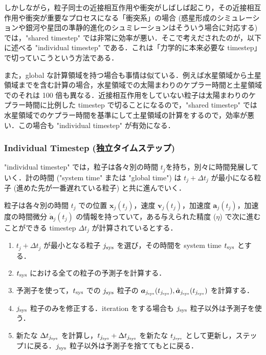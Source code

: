 \documentclass[11pt,a4paper,oneside,onecolumn]{jarticle}
\begin{document}
しかしながら，粒子同士の近接相互作用や衝突がしばしば起こり，その近接相互作用や衝突が重要なプロセスになる「衝突系」の場合 (惑星形成のシミュレーションや銀河や星団の準静的進化のシュミレーションはそういう場合に対応する) では，"shared timestep" では非常に効率が悪い．そこで考えだされたのが，以下に述べる "individual timestep" である．これは「力学的に本来必要な timestep」で切っていこうという方法である．

また，global な計算領域を持つ場合も事情は似ている．例えば水星領域から土星領域までを含む計算の場合，水星領域での太陽まわりのケプラー時間と土星領域でのそれは 100 倍も異なる．近接相互作用をしていない粒子は太陽まわりのケプラー時間に比例した timestep で切ることになるので，"shared timestep" では水星領域でのケプラー時間を基準にして土星領域の計算をするので，効率が悪い．この場合も "individual timestep" が有効になる．

\subsubsection{Individual Timestep (独立タイムステップ) }
"individual timestep" では，粒子は各々別の時間 $t_j$を持ち，別々に時間発展していく．計の時間 ("system time" または "global time") は $t_j + \Delta t_j$ が最小になる粒子 (進めた先が一番遅れている粒子) と共に進んでいく．

粒子は各々別の時間 $t_j$ での位置 ${\bm x}_j (t_j)$，速度 ${\bm v}_j (t_j)$，加速度 ${\bm a}_j (t_j)$，加速度の時間微分 $\dot{{\bm a}}_j (t_j)$ の情報を持っていて，ある与えられた精度 ($\eta$) で次に進むことができる timestep $\Delta t_j$ が計算されているとする．

\begin{enumerate}
\item $t_j + \Delta t_j$ が最小となる粒子 $j_{{\rm sys}}$ を選び，その時間を system time $t_{{\rm sys}}$ とする．
\item $t_{{\rm sys}}$ における全ての粒子の予測子を計算する．
\item 予測子を使って，$t_{{\rm sys}}$ での $j_{{\rm sys}}$ 粒子の ${\bm a}_{j_{{\rm sys}}}(t_{j_{{\rm sys}}}), \dot{{\bm a}}_{j_{{\rm sys}}} (t_{j_{{\rm sys}}})$ を計算する．
\item $j_{{\rm sys}}$ 粒子のみを修正する．iteration をする場合も $j_{{\rm sys}}$ 粒子以外は予測子を使う．
\item 新たな $\Delta t_{j_{{\rm sys}}}$  を計算し，$t_{j_{{\rm sys}}} + \Delta t_{j_{{\rm sys}}}$ を新たな $t_{j_{{\rm sys}}}$ として更新し，ステップ1に戻る．$j_{{\rm sys}}$ 粒子以外は予測子を捨ててもとに戻る．
\end{enumerate}
\end{document}
